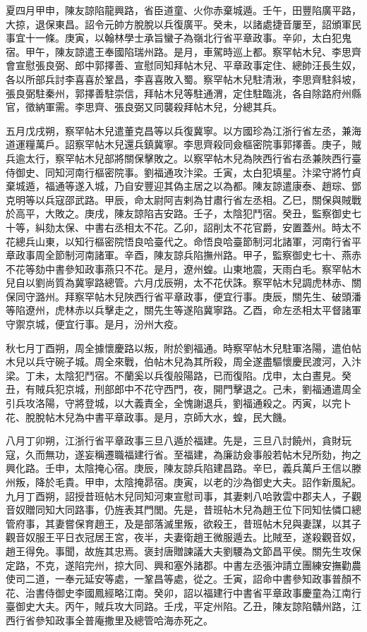 \begin{pinyinscope}
 夏四月甲申，陳友諒陷龍興路，省臣道童、火你赤棄城遁。壬午，田豐陷廣平路，大掠，退保東昌。詔令元帥方脫脫以兵復廣平。癸未，以諸處捷音屢至，詔頒軍民事宜十一條。庚寅，以翰林學士承旨蠻子為嶺北行省平章政事。辛卯，太白犯鬼宿。甲午，陳友諒遣王奉國陷瑞州路。是月，車駕時巡上都。察罕帖木兒、李思齊會宣慰張良弼、郎中郭擇善、宣慰同知拜帖木兒、平章政事定住、總帥汪長生奴，各以所部兵討李喜喜於鞏昌，李喜喜敗入蜀。察罕帖木兒駐清湫，李思齊駐斜坡，張良弼駐秦州，郭擇善駐崇信，拜帖木兒等駐通渭，定住駐臨洮，各自除路府州縣官，徵納軍需。李思齊、張良弼又同襲殺拜帖木兒，分總其兵。



 五月戊戌朔，察罕帖木兒遣董克昌等以兵復冀寧。以方國珍為江浙行省左丞，兼海道運糧萬戶。詔察罕帖木兒還兵鎮冀寧。李思齊殺同僉樞密院事郭擇善。庚子，賊兵逾太行，察罕帖木兒部將關保擊敗之。以察罕帖木兒為陜西行省右丞兼陜西行臺侍御史、同知河南行樞密院事。劉福通攻汴梁。壬寅，太白犯填星。汴梁守將竹貞棄城遁，福通等遂入城，乃自安豐迎其偽主居之以為都。陳友諒遣康泰、趙琮、鄧克明等以兵寇邵武路。甲辰，命太尉阿吉剌為甘肅行省左丞相。乙巳，關保與賊戰於高平，大敗之。庚戌，陳友諒陷吉安路。壬子，太陰犯鬥宿。癸丑，監察御史七十等，糾劾太保、中書右丞相太不花。乙卯，詔削太不花官爵，安置蓋州。時太不花總兵山東，以知行樞密院悟良哈臺代之。命悟良哈臺節制河北諸軍，河南行省平章政事周全節制河南諸軍。辛酉，陳友諒兵陷撫州路。甲子，監察御史七十、燕赤不花等劾中書參知政事燕只不花。是月，遼州蝗。山東地震，天雨白毛。察罕帖木兒自以劉尚質為冀寧路總管。六月戊辰朔，太不花伏誅。察罕帖木兒調虎林赤、關保同守潞州。拜察罕帖木兒陜西行省平章政事，便宜行事。庚辰，關先生、破頭潘等陷遼州，虎林赤以兵擊走之，關先生等遂陷冀寧路。乙酉，命左丞相太平督諸軍守禦京城，便宜行事。是月，汾州大疫。



 秋七月丁酉朔，周全據懷慶路以叛，附於劉福通。時察罕帖木兒駐軍洛陽，遣伯帖木兒以兵守碗子城。周全來戰，伯帖木兒為其所殺，周全遂盡驅懷慶民渡河，入汴梁。丁未，太陰犯鬥宿。不蘭奚以兵復般陽路，已而復陷。戊申，太白晝見。癸丑，有賊兵犯京城，刑部郎中不花守西門，夜，開門擊退之。己未，劉福通遣周全引兵攻洛陽，守將登城，以大義責全，全愧謝退兵，劉福通殺之。丙寅，以完卜花、脫脫帖木兒為中書平章政事。是月，京師大水，蝗，民大饑。



 八月丁卯朔，江浙行省平章政事三旦八遁於福建。先是，三旦八討饒州，貪財玩寇，久而無功，遂妄稱遷職福建行省。至福建，為廉訪僉事般若帖木兒所劾，拘之興化路。壬申，太陰掩心宿。庚辰，陳友諒兵陷建昌路。辛巳，義兵萬戶王信以滕州叛，降於毛貴。甲申，太陰掩昴宿。庚寅，以老的沙為御史大夫。詔作新風紀。九月丁酉朔，詔授昔班帖木兒同知河東宣慰司事，其妻剌八哈敦雲中郡夫人，子觀音奴贈同知大同路事，仍旌表其門閭。先是，昔班帖木兒為趙王位下同知怯憐口總管府事，其妻嘗保育趙王，及是部落滅里叛，欲殺王，昔班帖木兒與妻謀，以其子觀音奴服王平日衣冠居王宮，夜半，夫妻衛趙王微服遁去。比賊至，遂殺觀音奴，趙王得免。事聞，故旌其忠焉。褒封唐贈諫議大夫劉騕為文節昌平侯。關先生攻保定路，不克，遂陷完州，掠大同、興和塞外諸郡。中書左丞張沖請立團練安撫勸農使司二道，一奉元延安等處，一鞏昌等處，從之。壬寅，詔命中書參知政事普顏不花、治書侍御史李國鳳經略江南。癸卯，詔以福建行中書省平章政事慶童為江南行臺御史大夫。丙午，賊兵攻大同路。壬戌，平定州陷。乙丑，陳友諒陷贛州路，江西行省參知政事全普庵撒里及總管哈海赤死之。




\end{pinyinscope}
